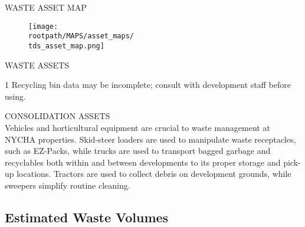 \textcolor{ccorange}{WASTE ASSET MAP}
\begin{figure}[H]
\raggedright
\texttt{[image: \\rootpath/MAPS/asset\_maps/\\tds\_asset\_map.png]}
\end{figure}
\pagebreak

\textcolor{ccorange}{WASTE ASSETS}

\begin{table}[H]
\begin{threeparttable}
\small



\begin{tablenotes}
\item [1] Recycling bin data may be incomplete; consult with development staff before using.
\end{tablenotes}
\end{threeparttable}
\end{table}

\textcolor{ccorange}{CONSOLIDATION ASSETS}\\
Vehicles and horticultural equipment are crucial to waste management at NYCHA properties. Skid-steer loaders are used to manipulate waste receptacles, such as EZ-Packs, while trucks are used to transport bagged garbage and recyclables both within and between developments to its proper storage and pick-up locations. Tractors are used to collect debris on development grounds, while sweepers simplify routine cleaning.
\begin{table}[H]

\end{table}
\pagebreak

\parbox[T][3in][c]{\textwidth}{
\textcolor{ccorange}{\section{Estimated Waste Volumes}}

}

